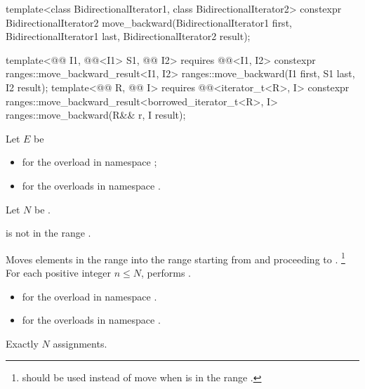 %
\begin{itemdecl}
template<class BidirectionalIterator1, class BidirectionalIterator2>
  constexpr BidirectionalIterator2
    move_backward(BidirectionalIterator1 first, BidirectionalIterator1 last,
                  BidirectionalIterator2 result);

template<@@ I1, @@<I1> S1, @@ I2>
  requires @@<I1, I2>
  constexpr ranges::move_backward_result<I1, I2>
    ranges::move_backward(I1 first, S1 last, I2 result);
template<@@ R, @@ I>
  requires @@<iterator_t<R>, I>
  constexpr ranges::move_backward_result<borrowed_iterator_t<R>, I>
    ranges::move_backward(R&& r, I result);
\end{itemdecl}

\begin{itemdescr}
\pnum
Let $E$ be
\begin{itemize}
\item
  for the overload in namespace ;
\item
  for the overloads in namespace .
\end{itemize}
Let $N$ be .

\pnum
\expects
{} is not in the range .

\pnum
\effects
Moves elements in the range 
into the range 
starting from  and proceeding to .%
\footnote{ should be used instead of move
when  is in the range .}
For each positive integer $n \le N$,
performs .

\pnum
\returns
\begin{itemize}
\item
  for the overload in namespace .
\item
  for the overloads in namespace .
\end{itemize}

\pnum
\complexity
Exactly $N$ assignments.
\end{itemdescr}

